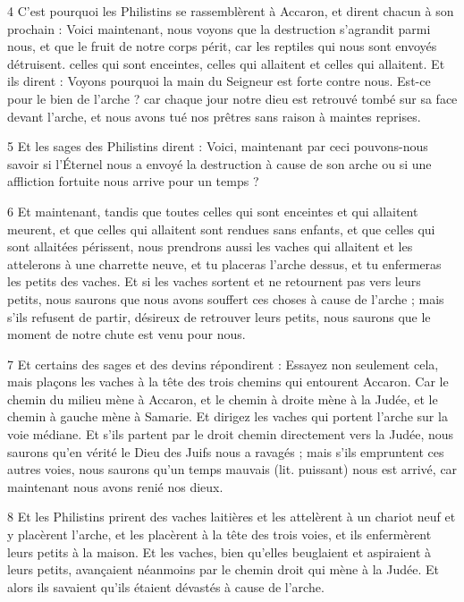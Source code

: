 \par 4 C'est pourquoi les Philistins se rassemblèrent à Accaron, et dirent chacun à son prochain : Voici maintenant, nous voyons que la destruction s'agrandit parmi nous, et que le fruit de notre corps périt, car les reptiles qui nous sont envoyés détruisent. celles qui sont enceintes, celles qui allaitent et celles qui allaitent. Et ils dirent : Voyons pourquoi la main du Seigneur est forte contre nous. Est-ce pour le bien de l'arche ? car chaque jour notre dieu est retrouvé tombé sur sa face devant l'arche, et nous avons tué nos prêtres sans raison à maintes reprises.

\par 5 Et les sages des Philistins dirent : Voici, maintenant par ceci pouvons-nous savoir si l'Éternel nous a envoyé la destruction à cause de son arche ou si une affliction fortuite nous arrive pour un temps ?

\par 6 Et maintenant, tandis que toutes celles qui sont enceintes et qui allaitent meurent, et que celles qui allaitent sont rendues sans enfants, et que celles qui sont allaitées périssent, nous prendrons aussi les vaches qui allaitent et les attelerons à une charrette neuve, et tu placeras l'arche dessus, et tu enfermeras les petits des vaches. Et si les vaches sortent et ne retournent pas vers leurs petits, nous saurons que nous avons souffert ces choses à cause de l'arche ; mais s'ils refusent de partir, désireux de retrouver leurs petits, nous saurons que le moment de notre chute est venu pour nous.

\par 7 Et certains des sages et des devins répondirent : Essayez non seulement cela, mais plaçons les vaches à la tête des trois chemins qui entourent Accaron. Car le chemin du milieu mène à Accaron, et le chemin à droite mène à la Judée, et le chemin à gauche mène à Samarie. Et dirigez les vaches qui portent l’arche sur la voie médiane. Et s’ils partent par le droit chemin directement vers la Judée, nous saurons qu’en vérité le Dieu des Juifs nous a ravagés ; mais s'ils empruntent ces autres voies, nous saurons qu'un temps mauvais (lit. puissant) nous est arrivé, car maintenant nous avons renié nos dieux.

\par 8 Et les Philistins prirent des vaches laitières et les attelèrent à un chariot neuf et y placèrent l'arche, et les placèrent à la tête des trois voies, et ils enfermèrent leurs petits à la maison. Et les vaches, bien qu'elles beuglaient et aspiraient à leurs petits, avançaient néanmoins par le chemin droit qui mène à la Judée. Et alors ils savaient qu’ils étaient dévastés à cause de l’arche.

